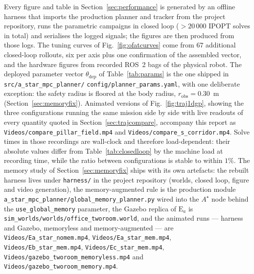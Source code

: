 \documentclass[11pt,a4paper]{article}
\newcommand{\astar}{$A^\star$}
\newcommand{\robs}{r_{\mathrm{obs}}}
\newcommand{\thst}{\theta_{\mathrm{dep}}}
\begin{document}
Every figure and table in Section~\ref{sec:performance} is generated by an offline harness that imports the
production planner and tracker from the project repository, runs the parametric campaigns in closed loop
(${>}20\,000$ IPOPT solves in total) and serialises the logged signals; the figures are then produced from
those logs. The tuning curves of Fig.~\ref{fig:ofatcurves} come from $67$ additional closed-loop rollouts,
six per axis plus one confirmation of the assembled vector, and the hardware figures from recorded ROS~2 bags
of the physical robot. The deployed parameter vector $\thst$ of Table~\ref{tab:params} is the one shipped in
\texttt{src/a\_star\_mpc\_planner/} \texttt{config/planner\_params.yaml}, with one deliberate exception:
the safety radius is floored at the body radius, $\robs=0.30$~m (Section~\ref{sec:memoryfix}). Animated versions of
Fig.~\ref{fig:traj1dgp}, showing the three configurations running the same mission side by side with live
readouts of every quantity quoted in Section~\ref{sec:trajcompare}, accompany this report as
\texttt{Videos/compare\_pillar\_field.mp4} and \texttt{Videos/compare\_s\_corridor.mp4}. Solve times in those
recordings are wall-clock and therefore load-dependent: their absolute values differ from
Table~\ref{tab:closedloop} by the machine load at recording time, while the ratio between configurations is
stable to within $1\%$. The memory study of Section~\ref{sec:memoryfix} ships with its own artefacts: the
rebuilt harness lives under \texttt{harness/} in the project repository (worlds, closed loop, figure and
video generation), the memory-augmented rule is the production module
\texttt{a\_star\_mpc\_planner/global\_memory\_planner.py} wired into the \astar{} node behind the
\texttt{use\_global\_memory} parameter, the Gazebo replica of $\mathrm{E}_a$ is
\texttt{sim\_worlds/worlds/office\_tworoom.world}, and the animated runs --- harness and Gazebo, memoryless
and memory-augmented --- are \texttt{Videos/Ea\_star\_nomem.mp4}, \texttt{Videos/Ea\_star\_mem.mp4},
\texttt{Videos/Eb\_star\_mem.mp4}, \texttt{Videos/Ec\_star\_mem.mp4},
\texttt{Videos/gazebo\_tworoom\_memoryless.mp4} and \texttt{Videos/gazebo\_tworoom\_memory.mp4}.


\end{document}
